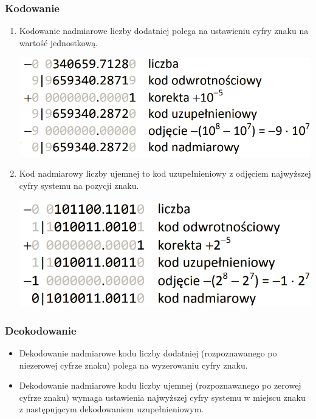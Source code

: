 \documentclass[12pt]{article}
\begin{document}
    \subsubsection{Kodowanie}
    \begin{enumerate}
        \item Kodowanie nadmiarowe liczby dodatniej polega na
        ustawieniu cyfry znaku na wartość jednostkową.
        \begin{center}
            \includegraphics[scale=0.4]{graphics/number-repr/nad-encode-dec.png}
        \end{center}
        \item Kod nadmiarowy liczby ujemnej to kod uzupełnieniowy z odjęciem najwyższej cyfry systemu
        na pozycji znaku.
        \begin{center}
            \includegraphics[scale=0.4]{graphics/number-repr/nad-encode-bin.png}
        \end{center}
    \end{enumerate}


    \subsubsection{Deokodowanie}
    \begin{itemize}
        \item Dekodowanie nadmiarowe kodu liczby dodatniej
        (rozpoznawanego po niezerowej cyfrze znaku) polega na wyzerowaniu cyfry znaku.
        \item Dekodowanie nadmiarowe kodu liczby ujemnej
        (rozpoznawanego po zerowej cyfrze znaku) wymaga
        ustawienia najwyższej cyfry systemu w miejscu znaku z następującym dekodowaniem uzupełnieniowym.
    \end{itemize}
\end{document}
